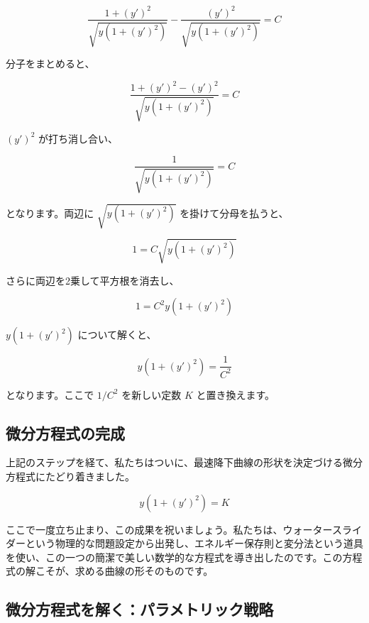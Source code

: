 \documentclass[12pt,a4paper]{ltjsarticle}
\begin{document}
\begin{equation}
\frac{1+(y')^2}{\sqrt{y(1+(y')^2)}} - \frac{(y')^2}{\sqrt{y(1+(y')^2)}} = C
\end{equation}

分子をまとめると、

\begin{equation}
\frac{1+(y')^2 - (y')^2}{\sqrt{y(1+(y')^2)}} = C
\end{equation}

$(y')^2$ が打ち消し合い、

\begin{equation}
\frac{1}{\sqrt{y(1+(y')^2)}} = C
\end{equation}

となります。両辺に $\sqrt{y(1+(y')^2)}$ を掛けて分母を払うと、

\begin{equation}
1 = C \sqrt{y(1+(y')^2)}
\end{equation}

さらに両辺を2乗して平方根を消去し、

\begin{equation}
1 = C^2 y(1+(y')^2)
\end{equation}

$y(1+(y')^2)$ について解くと、

\begin{equation}
y(1+(y')^2) = \frac{1}{C^2}
\end{equation}

となります。ここで $1/C^2$ を新しい定数 $K$ と置き換えます。

\subsection{微分方程式の完成}

上記のステップを経て、私たちはついに、最速降下曲線の形状を決定づける微分方程式にたどり着きました。

\begin{equation}
y(1+(y')^2) = K
\end{equation}

ここで一度立ち止まり、この成果を祝いましょう。私たちは、ウォータースライダーという物理的な問題設定から出発し、エネルギー保存則と変分法という道具を使い、この一つの簡潔で美しい数学的な方程式を導き出したのです。この方程式の解こそが、求める曲線の形そのものです。

\subsection{微分方程式を解く：パラメトリック戦略}
\end{document}
